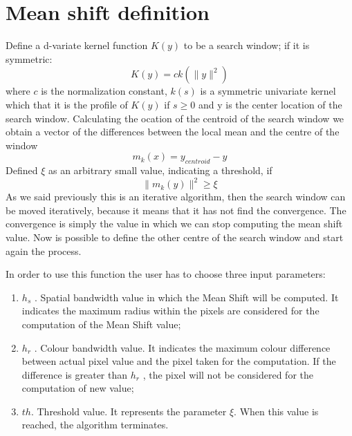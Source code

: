 \section{Mean shift definition}
Define a d-variate kernel function $K(y)$ to be a search window; if it is symmetric:
\begin{equation}
K(y)= ck(\|y\|^{2})
\end{equation}
where $c$ is the normalization constant, $k(s)$ is a symmetric univariate kernel which that it is the profile of $K(y)$ if $s \geq 0$ and y is the center location of the search window. Calculating the ocation of the centroid of the search window we obtain a vector of the differences between the local mean and the centre of the window
\begin{equation}
m_{k}{(x)}= y_{centroid} - y
\end{equation} 
Defined $\xi$ as an arbitrary small value, indicating a threshold, if
\begin{equation}
\|m_{k}(y)\|^2 \geq \xi     
\end{equation}
As we said previously this is an iterative algorithm, then the search window can be moved iteratively, because it means that it has not find the convergence. The convergence is simply the value in which we can stop computing the mean shift value. Now is possible to define the other centre of the search window and start again the process.

\bigskip

In order to use this function the user has to choose three input parameters:
\begin{enumerate}
\item $h_{s}$ . Spatial bandwidth value in which the Mean Shift will be computed. It indicates the maximum radius within the pixels are considered for the computation of the Mean Shift value;

\item $h_{r}$  . Colour bandwidth value. It indicates the maximum colour difference between
actual pixel value and the pixel taken for the computation. If the difference is greater than $h_{r}$ , the pixel will not be considered for the computation of new value;

\item $th$. Threshold value. It represents the parameter $\xi$. When this value is reached, the algorithm terminates.
\end{enumerate}